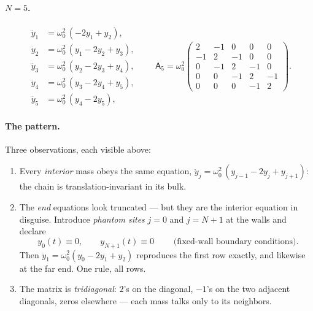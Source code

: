 \documentclass[11pt]{article}
\theoremstyle{plain}
\theoremstyle{definition}
\theoremstyle{remark}
\newcommand{\mA}{\mathsf{A}}
\begin{document}
\paragraph{$N=5$.}
\begin{equation}
  \begin{aligned}
  \ddot y_1 &= \omega_0^2\,(-2y_1 + y_2),\\
  \ddot y_2 &= \omega_0^2\,(y_1 - 2y_2 + y_3),\\
  \ddot y_3 &= \omega_0^2\,(y_2 - 2y_3 + y_4),\\
  \ddot y_4 &= \omega_0^2\,(y_3 - 2y_4 + y_5),\\
  \ddot y_5 &= \omega_0^2\,(y_4 - 2y_5),
  \end{aligned}
  \qquad
  \mA_5 = \omega_0^2
  \begin{pmatrix}
    2 & -1 & 0 & 0 & 0\\
    -1 & 2 & -1 & 0 & 0\\
    0 & -1 & 2 & -1 & 0\\
    0 & 0 & -1 & 2 & -1\\
    0 & 0 & 0 & -1 & 2
  \end{pmatrix}.
\end{equation}

\paragraph{The pattern.}
Three observations, each visible above:
\begin{enumerate}
  \item Every \emph{interior} mass obeys the same equation,
  $\ddot y_j = \omega_0^2\,(y_{j-1} - 2y_j + y_{j+1})$: the chain is
  translation-invariant in its bulk.
  \item The \emph{end} equations look truncated --- but they are the interior
  equation in disguise. Introduce \emph{phantom sites} $j=0$ and $j=N+1$ at
  the walls and declare
  \begin{equation}
    \boxed{\;y_0(t) \equiv 0, \qquad y_{N+1}(t) \equiv 0\;}
    \qquad\text{(fixed-wall boundary conditions)}.
  \end{equation}
  Then $\ddot y_1 = \omega_0^2(y_0 - 2y_1 + y_2)$ reproduces the first row
  exactly, and likewise at the far end. One rule, all rows.
  \item The matrix is \emph{tridiagonal}: $2$'s on the diagonal, $-1$'s on
  the two adjacent diagonals, zeros elsewhere --- each mass talks only to its
  neighbors.
\end{enumerate}
\end{document}
